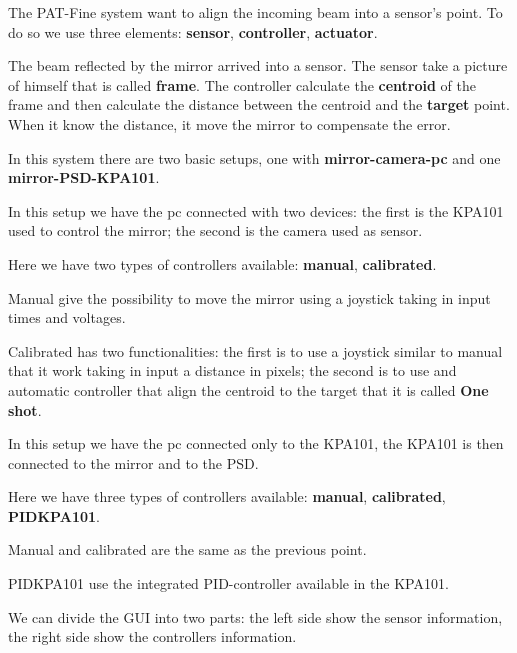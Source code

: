

The PAT-Fine system want to align the incoming beam into a sensor's
point. To do so we use three elements: \textbf{sensor},
\textbf{controller}, \textbf{actuator}.


The beam reflected by the mirror arrived into a sensor. The sensor take
a picture of himself that is called \textbf{frame}. The controller
calculate the \textbf{centroid} of the frame and then calculate the
distance between the centroid and the \textbf{target} point. When it
know the distance, it move the mirror to compensate the error.

In this system there are two basic setups, one with
\textbf{mirror-camera-pc} and one \textbf{mirror-PSD-KPA101}.


In this setup we have the pc connected with two devices: the first is
the KPA101 used to control the mirror; the second is the camera used as
sensor.

Here we have two types of controllers available: \textbf{manual},
\textbf{calibrated}.

Manual give the possibility to move the mirror using a joystick taking
in input times and voltages.

Calibrated has two functionalities: the first is to use a joystick
similar to manual that it work taking in input a distance in pixels; the
second is to use and automatic controller that align the centroid to the
target that it is called \textbf{One shot}.


In this setup we have the pc connected only to the KPA101, the KPA101 is
then connected to the mirror and to the PSD.

Here we have three types of controllers available: \textbf{manual},
\textbf{calibrated}, \textbf{PIDKPA101}.

Manual and calibrated are the same as the previous point.

PIDKPA101 use the integrated PID-controller available in the KPA101.



We can divide the GUI into two parts: the left side show the sensor
information, the right side show the controllers information.


